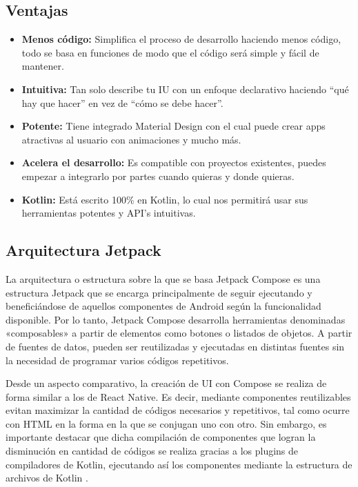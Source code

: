 \subsection*{Ventajas}

\begin{itemize}
	\item \textbf{Menos código:} Simplifica el proceso de desarrollo haciendo menos código, todo se basa en funciones de modo que el código será simple y fácil de mantener.
	\item \textbf{Intuitiva:} Tan solo describe tu IU con un enfoque declarativo haciendo “qué hay que hacer” en vez de “cómo se debe hacer”.
	\item \textbf{Potente:} Tiene integrado Material Design con el cual puede crear apps atractivas al usuario con animaciones y mucho más.
	\item \textbf{Acelera el desarrollo:} Es compatible con proyectos existentes, puedes empezar a integrarlo por partes cuando quieras y donde quieras.
	\item \textbf{Kotlin:} Está escrito 100\% en Kotlin, lo cual nos permitirá usar sus herramientas potentes y API’s intuitivas.
\end{itemize}

\subsection*{Arquitectura Jetpack}
La arquitectura o estructura sobre la que se basa Jetpack Compose es una estructura Jetpack que se encarga principalmente de seguir ejecutando y beneficiándose de aquellos componentes de Android según la funcionalidad disponible. Por lo tanto, Jetpack Compose desarrolla herramientas denominadas «composables» a partir de elementos como botones o listados de objetos. A partir de fuentes de datos, pueden ser reutilizadas y ejecutadas en distintas fuentes sin la necesidad de programar varios códigos repetitivos.

Desde un aspecto comparativo, la creación de UI con Compose se realiza de forma similar a los de React Native. Es decir, mediante componentes reutilizables evitan maximizar la cantidad de códigos necesarios y repetitivos, tal como ocurre con HTML en la forma en la que se conjugan uno con otro. Sin embargo, es importante destacar que dicha compilación de componentes que logran la disminución en cantidad de códigos se realiza gracias a los plugins de compiladores de Kotlin, ejecutando así los componentes mediante la estructura de archivos de Kotlin \cite{CitaD19}. 

